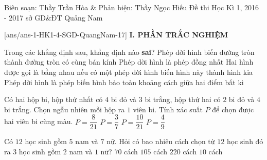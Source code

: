 	\begin{name}
{Biên soạn: Thầy Trần Hòa \& Phản biện: Thầy Ngọc Hiếu}
		{Đề thi Học Kì 1, 2016 - 2017 sở GD\&ĐT Quảng Nam}
	\end{name}
	\setcounter{ex}{0}\setcounter{bt}{0}
	[ans/ans-1-HK1-4-SGD-QuangNam-17]
\noindent\textbf{I. PHẦN TRẮC NGHIỆM}
\begin{ex}%
	Trong các khẳng định sau, khẳng định nào {\bf sai}?
	\choice
	{Phép dời hình biến đường tròn thành đường tròn có cùng bán kính}
	{\True Phép dời hình là phép đồng nhất}
	{Hai hình được gọi là bằng nhau nếu có một phép dời hình biến hình này thành hình kia}
	{Phép dời hình là phép biến hình bảo toàn khoảng cách giữa hai điểm bất kì}
\end{ex}
\begin{ex}%
	Có hai hộp bi, hộp thứ nhất có $4$ bi đỏ và $3$ bi trắng, hộp thứ hai có $2$ bi đỏ và $4$ bi trắng. Chọn ngẫu nhiên mỗi hộp ra $1$ viên bi. Tính xác suất $P$ để chọn được hai viên bi cùng màu.
	\choice
	{$P=\dfrac{8}{21}$}
	{$P=\dfrac{3}{7}$}
	{\True $P=\dfrac{10}{21}$}
	{$P=\dfrac{4}{9}$}
\end{ex}
\begin{ex}%
	Có $12$ học sinh gồm $5$ nam và $7$ nữ. Hỏi có bao nhiêu cách chọn từ $12$ học sinh đó ra $3$ học sinh gồm $2$ nam và $1$ nữ?
	\choice
	{\True $70$ cách}
	{$105$ cách}
	{$220$ cách}
	{$10$ cách}
\end{ex}
